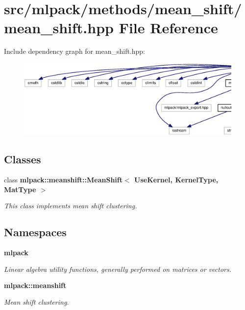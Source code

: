 \section{src/mlpack/methods/mean\+\_\+shift/mean\+\_\+shift.hpp File Reference}
\label{mean__shift_8hpp}
Include dependency graph for mean\+\_\+shift.\+hpp\+:
\nopagebreak
\begin{figure}[H]
\begin{center}
\leavevmode
\includegraphics[width=350pt]{mean__shift_8hpp__incl}
\end{center}
\end{figure}
\subsection*{Classes}
\begin{DoxyCompactItemize}
\item 
class {\bf mlpack\+::meanshift\+::\+Mean\+Shift$<$ Use\+Kernel, Kernel\+Type, Mat\+Type $>$}
\begin{DoxyCompactList}\small\item\em This class implements mean shift clustering. \end{DoxyCompactList}\end{DoxyCompactItemize}
\subsection*{Namespaces}
\begin{DoxyCompactItemize}
\item 
 {\bf mlpack}
\begin{DoxyCompactList}\small\item\em Linear algebra utility functions, generally performed on matrices or vectors. \end{DoxyCompactList}\item 
 {\bf mlpack\+::meanshift}
\begin{DoxyCompactList}\small\item\em Mean shift clustering. \end{DoxyCompactList}\end{DoxyCompactItemize}


